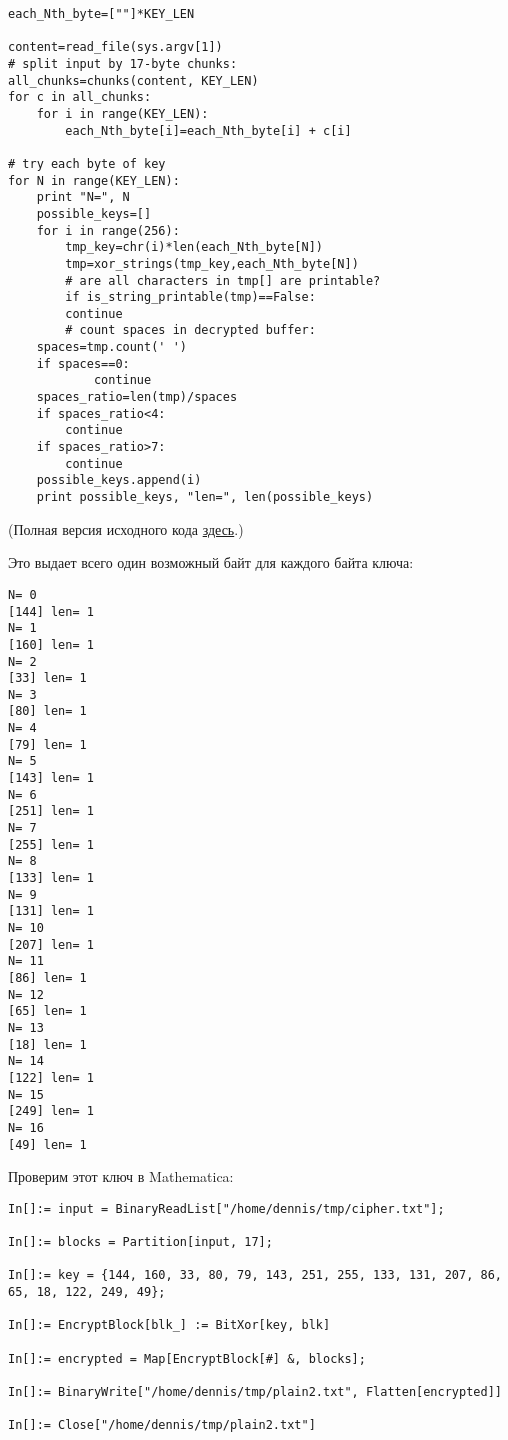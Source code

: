 \begin{lstlisting}[caption=Python script,style=custompy]
each_Nth_byte=[""]*KEY_LEN

content=read_file(sys.argv[1])
# split input by 17-byte chunks:
all_chunks=chunks(content, KEY_LEN)
for c in all_chunks:
    for i in range(KEY_LEN):
        each_Nth_byte[i]=each_Nth_byte[i] + c[i]

# try each byte of key
for N in range(KEY_LEN):
    print "N=", N
    possible_keys=[]
    for i in range(256):
        tmp_key=chr(i)*len(each_Nth_byte[N])
        tmp=xor_strings(tmp_key,each_Nth_byte[N])
        # are all characters in tmp[] are printable?
        if is_string_printable(tmp)==False:
	    continue
        # count spaces in decrypted buffer:
	spaces=tmp.count(' ')
	if spaces==0:
            continue
	spaces_ratio=len(tmp)/spaces
	if spaces_ratio<4:
	    continue
	if spaces_ratio>7:
	    continue
	possible_keys.append(i)
    print possible_keys, "len=", len(possible_keys)
\end{lstlisting}

(Полная версия исходного кода \href{\GitHubBlobMasterURL/ff/XOR/mask_2/files/decrypt3.py}{здесь}.)

Это выдает всего один возможный байт для каждого байта ключа:

\begin{lstlisting}
N= 0
[144] len= 1
N= 1
[160] len= 1
N= 2
[33] len= 1
N= 3
[80] len= 1
N= 4
[79] len= 1
N= 5
[143] len= 1
N= 6
[251] len= 1
N= 7
[255] len= 1
N= 8
[133] len= 1
N= 9
[131] len= 1
N= 10
[207] len= 1
N= 11
[86] len= 1
N= 12
[65] len= 1
N= 13
[18] len= 1
N= 14
[122] len= 1
N= 15
[249] len= 1
N= 16
[49] len= 1
\end{lstlisting}

Проверим этот ключ в Mathematica:

\begin{lstlisting}[caption=Mathematica,style=custommath]
In[]:= input = BinaryReadList["/home/dennis/tmp/cipher.txt"];

In[]:= blocks = Partition[input, 17];

In[]:= key = {144, 160, 33, 80, 79, 143, 251, 255, 133, 131, 207, 86, 65, 18, 122, 249, 49};

In[]:= EncryptBlock[blk_] := BitXor[key, blk]

In[]:= encrypted = Map[EncryptBlock[#] &, blocks];

In[]:= BinaryWrite["/home/dennis/tmp/plain2.txt", Flatten[encrypted]]

In[]:= Close["/home/dennis/tmp/plain2.txt"]
\end{lstlisting}

